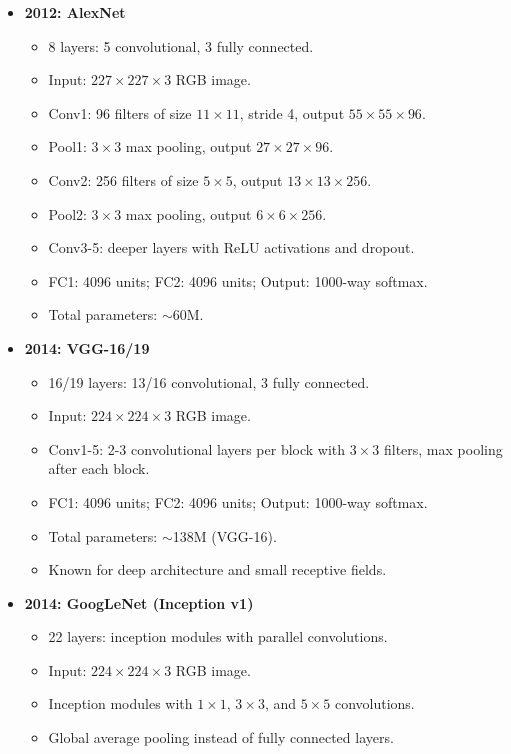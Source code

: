 \documentclass{article}
\begin{document}
\begin{itemize}[leftmargin=1.5em]
  \item \textbf{2012: AlexNet} 
  \begin{itemize}
    \item 8 layers: 5 convolutional, 3 fully connected.
    \item Input: $227 \times 227 \times 3$ RGB image.
    \item Conv1: 96 filters of size $11 \times 11$, stride 4, output $55 \times 55 \times 96$.
    \item Pool1: $3 \times 3$ max pooling, output $27 \times 27 \times 96$.
    \item Conv2: 256 filters of size $5 \times 5$, output $13 \times 13 \times 256$.
    \item Pool2: $3 \times 3$ max pooling, output $6 \times 6 \times 256$.
    \item Conv3-5: deeper layers with ReLU activations and dropout.
    \item FC1: 4096 units; FC2: 4096 units; Output: 1000-way softmax.
    \item Total parameters: $\sim$60M.
  \end{itemize}
  \item \textbf{2014: VGG-16/19}
    \begin{itemize}
        \item 16/19 layers: 13/16 convolutional, 3 fully connected.
        \item Input: $224 \times 224 \times 3$ RGB image.
        \item Conv1-5: 2-3 convolutional layers per block with $3 \times 3$ filters, max pooling after each block.
        \item FC1: 4096 units; FC2: 4096 units; Output: 1000-way softmax.
        \item Total parameters: $\sim$138M (VGG-16).
        \item Known for deep architecture and small receptive fields.
    \end{itemize}
  \item \textbf{2014: GoogLeNet (Inception v1)} 
    \begin{itemize}
        \item 22 layers: inception modules with parallel convolutions.
        \item Input: $224 \times 224 \times 3$ RGB image.
        \item Inception modules with $1 \times 1$, $3 \times 3$, and $5 \times 5$ convolutions.
        \item Global average pooling instead of fully connected layers.

\end{itemize}
\end{itemize}
\end{document}
